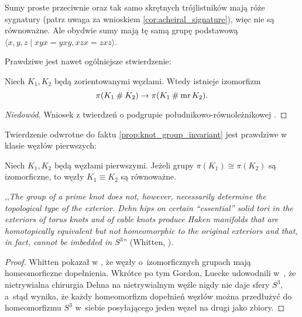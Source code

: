 Sumy proste przeciwnie oraz tak samo skrętnych trójlistników mają róże sygnatury (patrz uwaga za wnioskiem \ref{cor:acheiral_signature}), więc nie są równoważne.
Ale obydwie sumy mają tę samą grupę podstawową $\langle x,y,z \mid xyx=yxy,xzx=zxz\rangle$.

Prawdziwe jest nawet ogólniejsze stwierdzenie:

\begin{proposition}
    Niech $K_1, K_2$ będą zorientowanymi węzłami.
    Wtedy istnieje izomorfizm
    \begin{equation}
        \pi(K_1 \mathbin{\#} K_2) \to \pi(K_1 \mathbin{\#} \operatorname{mr} K_2).
    \end{equation}
\end{proposition}

\begin{proof}[Niedowód]
    Wniosek z twierdzeń o podgrupie południkowo-równoleżnikowej \cite[s. 75]{kawauchi1996}.
\end{proof}

Twierdzenie odwrotne do faktu \ref{prop:knot_group_invariant} jest prawdziwe w klasie węzłów pierwszych:

\begin{proposition}
    Niech $K_1, K_2$ będą węzłami pierwszymi.
    Jeżeli grupy $\pi(K_1) \cong \pi(K_2)$ są izomorficzne, to węzły $K_1 \equiv K_2$ są równoważne.
\end{proposition}

,,\emph{The group of a prime knot does not, however, necessarily determine the topological type of the exterior. Dehn hips on certain “essential” solid tori in the exteriors of torus knots and of cable knots produce Haken manifolds that are homotopically equivalent but not homeomorphic to the original exteriors and that, in fact, cannot be imbedded in $S^3$}'' (Whitten, \cite{whitten1987}).
%

\begin{proof}
%
%
%
    Whitten pokazał w \cite{whitten1987}, że węzły o~izomorficznych grupach mają homeomorficzne dopełnienia.
    Wkrótce po tym Gordon, Luecke udowodnili w~\cite{gordon1989}, że nietrywialna chirurgia Dehna na nietrywialnym węźle nigdy nie daje sfery $S^3$, a~stąd wynika, że każdy homeomorfizm dopełnień węzłów można przedłużyć do homeomorfizmu $S^3$ w~siebie posyłającego jeden węzeł na drugi jako zbiory.
%
\end{proof}

